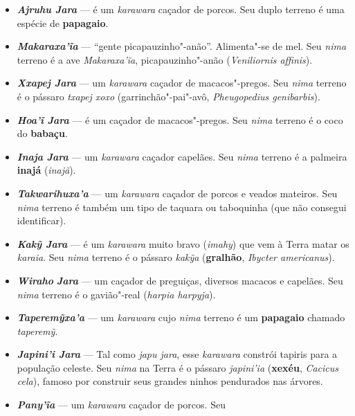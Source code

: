\begin{itemize}
  \emph{\textbf{Irapa Jara}} faz arcos de caça sem qualquer ferramenta:
  molda"-os com as mãos e em seguida distribui aos outros
  \emph{karawara}. Tem a árvore \textbf{pau"-d'arco} como \emph{nima}
  terrestre.
\item
  \emph{\textbf{Ajruhu Jara}} --- é um \emph{karawara} caçador de porcos.
  Seu duplo terreno é uma espécie de \textbf{papagaio}.
\item
  \emph{\textbf{Makaraxa'ĩa}} --- ``gente picapauzinho"-anão''.
  Alimenta"-se de mel. Seu \emph{nima} terreno é a ave
  \emph{Makaraxa'ĩa}, picapauzinho"-anão (\emph{Veniliornis affinis}).
\item
  \emph{\textbf{Xxapej Jara}} --- um \emph{karawara} caçador de
  macacos"-pregos. Seu \emph{nima} terreno é o pássaro \emph{txapej xoxo}
  (garrinchão"-pai"-avô, \emph{Pheugopedius genibarbis}).
\item
  \textbf{\emph{Hoa'ĩ} \emph{Jara}} --- é um caçador de macacos"-pregos.
  Seu \emph{nima} terreno é o coco do \textbf{babaçu}.
\item
  \textbf{\emph{Inaja} \emph{Jara}} --- um \emph{karawara} caçador
  capelães. Seu \emph{nima} terreno é a palmeira \textbf{inajá}
  (\emph{inajã}).
\item
  \emph{\textbf{Takwarihuxa'a}} --- um \emph{karawara} caçador de porcos e
  veados mateiros. Seu \emph{nima} terreno é também um tipo de taquara
  ou taboquinha (que não consegui identificar).
\item
  \emph{\textbf{Kakỹ Jara}} --- é um \emph{karawara} muito bravo
  (\emph{imahy}) que vem à Terra matar os \emph{karaia}. Seu \emph{nima}
  terreno é o pássaro \emph{kakỹa} (\textbf{gralhão}, \emph{Ibycter
  americanus}).
\item
  \emph{\textbf{Wiraho}} \emph{\textbf{Jara}} --- um caçador de preguiças,
  diversos macacos e capelães. Seu \emph{nima} terreno é o gavião"-real
  (\emph{harpia harpyja}).
\item
  \emph{\textbf{Taperemỹxa'a}} --- um \emph{karawara} cujo \emph{nima}
  terreno é um \textbf{papagaio} chamado \emph{taperemỹ}.
\item
  \emph{\textbf{Japini'i Jara}} --- Tal como \emph{japu jara}, esse
  \emph{karawara} constrói tapiris para a população celeste. Seu
  \emph{nima} na Terra é o pássaro \emph{japini'ia} (\textbf{xexéu},
  \emph{Cacicus} \emph{cela}), famoso por construir seus grandes ninhos
  pendurados nas árvores.
\item
  \emph{\textbf{Pany'ĩa}} --- um \emph{karawara} caçador de porcos. Seu

\end{itemize}
